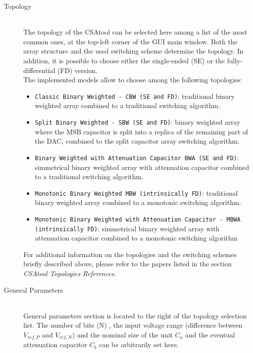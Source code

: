 \begin{description}

	\item[Topology] \hfill \\
	The topology of the CSAtool can be selected here among a list of the most common ones, at the top-left corner of the GUI main window. Both the array structure and the used switching scheme determine the topology. In addition, it is possible to choose either the single-ended (SE) or the fully-differential (FD) version. \\ The implemented models allow to choose among the following topologies:

\begin{itemize}
\item \texttt{Classic Binary Weighted - CBW (SE and FD)}: traditional binary weighted array combined to a traditional switching algorithm.
\item \texttt{Split Binary Weighted - SBW (SE and FD)}: binary weighted array where the MSB capacitor is split into a replica of the remaining part of the DAC, combined to the split capacitor array switching algorithm.
\item \texttt{Binary Weighted with Attenuation Capacitor BWA (SE and FD)}: simmetrical binary weighted array with attenuation capacitor combined to a traditional switching algorithm.
\item \texttt{Monotonic Binary Weighted MBW (intrinsically FD)}: traditional binary weighted array combined to a monotonic switching algorithm.
\item \texttt{Monotonic Binary Weighted with Attenuation Capacitor - MBWA (intrinsically FD)}: simmetrical binary weighted array with attenuation capacitor combined to a monotonic switching algorithm 
\end{itemize}

For additional information on the topologies and the switching schemes briefly described above, please refer to the papers listed in the section \emph{CSAtool Topologies References}.

	\item[General Parameters] \hfill \\
	General parameters section is located to the right of the topology selection list. The number of bits (N) , the input voltage range (difference between $V_{ref,P}$ and $V_{ref,N}$) and the nominal size of  the unit $C_{u}$ and the eventual attenuation capacitor $C_{b}$ can be arbitrarily set here. 


\end{description}
